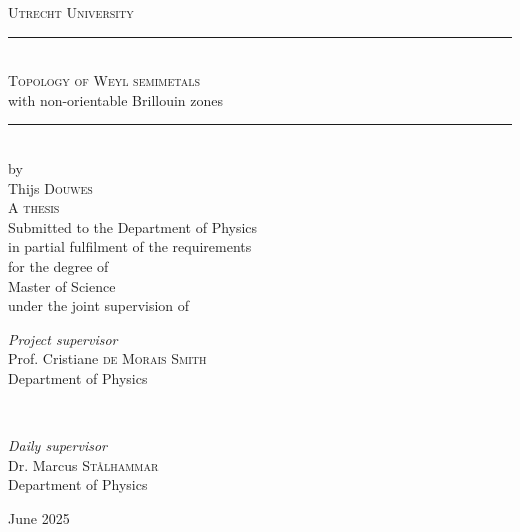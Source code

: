 \documentclass[12pt,a4paper]{report}
\theoremstyle{definition}
\theoremstyle{remark}
\newcommand{\?}{\stackrel{?}{=}}
\begin{document}
	
\begin{titlepage}  %
	\centering
	
	\textsc{\LARGE Utrecht University}\\[1.5cm]  %
	
	
	\rule{\linewidth}{0.5mm}\\[0.4cm]
	
	{\Huge\textsc{Topology of Weyl semimetals}\\[.2cm] \huge  with non-orientable Brillouin zones}\\[0.4cm] %
	
	\rule{\linewidth}{0.5mm}\\[.8cm]
	
	
	{\large by}\\[.8cm]
	
	
	{\LARGE Thijs \textsc{Douwes}}\\[1.1cm]
	
	
	
	{\Large \textsc{A thesis}}\\[.8cm]
	
	
	{\large Submitted to the Department of Physics}\\[.1cm]
	{\large in partial fulfilment of the requirements}\\[.1cm]
	{\large for the degree of}\\[.5cm]
	
	{\Large Master of Science}\\[.9cm]
	
	
	{\large under the joint supervision of}\\[1.5cm]
	
	
	\begin{minipage}{0.51\textwidth}
		\begin{flushleft}
			\large
			\textit{Project supervisor}\\
			Prof. Cristiane \textsc{de Morais Smith}\\
			\normalsize Department of Physics
		\end{flushleft}
	\end{minipage}
	~
	\begin{minipage}{0.42\textwidth}
		\begin{flushright}
			\large
			\textit{Daily supervisor}\\
			Dr. Marcus \textsc{St{\aa}lhammar}\\
			\normalsize Department of Physics
		\end{flushright}
	\end{minipage} %
	
	
	\vfill\vfill\vfill  %
	
	{\large June 2025} 
	
	\vfill  %
\end{titlepage}
\setcounter{page}{2}  %
	
\end{document}
